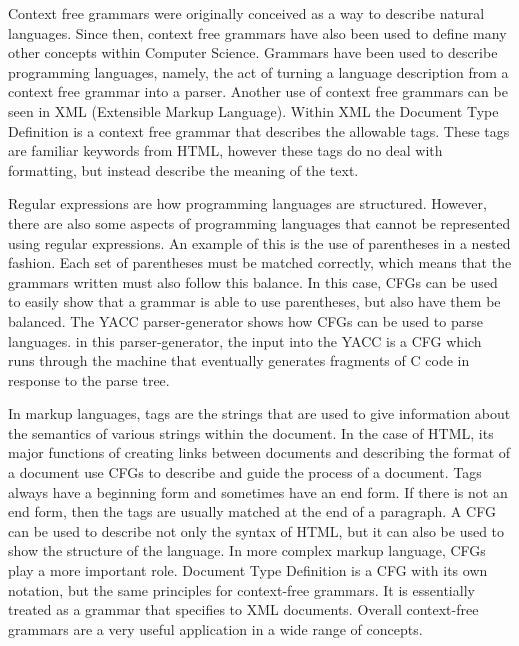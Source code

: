 \documentclass[11pt]{article}
\begin{document}
\begin{spacing}{1.5}
 Context free grammars were originally conceived as a way to describe natural languages. Since then, context
 free grammars have also been used to define many other concepts within Computer Science. Grammars have been used 
 to describe programming languages, namely, the act of turning a language description from a context free grammar
 into a parser. Another use of context free grammars can be seen in XML (Extensible Markup Language). Within XML 
 the Document Type Definition is a context free grammar that describes the allowable tags. These tags are familiar
 keywords from HTML, however these tags do no deal with formatting, but instead describe the meaning of the text.
 
 \indent Regular expressions are how programming languages are structured. However, there are also some aspects of 
 programming languages that cannot be represented using regular expressions. An example of this is the use of 
 parentheses in a nested fashion. Each set of parentheses must be matched correctly, which means that the grammars
 written must also follow this balance. In this case, CFGs can be used to easily show that a grammar is able to use
 parentheses, but also have them be balanced. The YACC parser-generator shows how CFGs can be used to parse languages.
 in this parser-generator, the input into the YACC is a CFG which runs through the machine that eventually generates
 fragments of C code in response to the parse tree.
 
 \indent In markup languages, tags are the strings that are used to give information about the semantics of various
 strings within the document. In the case of HTML, its major functions of creating links between documents and describing
 the format of a document use CFGs to describe and guide the process of a document. Tags always have a beginning form and
 sometimes have an end form. If there is not an end form, then the tags are usually matched at the end of a paragraph. A 
 CFG can be used to describe not only the syntax of HTML, but it can also be used to show the structure of the language. In
 more complex markup language, CFGs play a more important role. Document Type Definition is a CFG with its own notation,
 but the same principles for context-free grammars. It is essentially treated as a grammar that specifies to XML documents.
 Overall context-free grammars are a very useful application in a wide range of concepts.
\end{spacing}
\end{document}

